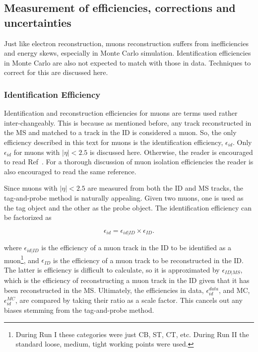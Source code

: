 \subsection{Measurement of efficiencies, corrections and uncertainties}
\par Just like electron reconstruction, muons reconstruction suffers from inefficiencies 
and energy skews, especially in Monte Carlo simulation. Identification efficiencies in Monte Carlo 
are also not expected to match with those in data.  
Techniques to correct for this are discussed here. 

\subsubsection{Identification Efficiency}
\par Identification and reconstruction 
efficiencies for muons are terms used rather inter-changeably. This 
is because as mentioned before, any track reconstructed in the MS and 
matched to a track in the ID is considered a muon. So, the only efficiency described 
in this text for muons is the identification efficiency, $\epsilon_{id}$. 
Only $\epsilon_{id}$ for muons with $|\eta|<2.5$ is discussed here. Otherwise, the reader 
is encouraged to read Ref~\cite{Aad:2014rra}. For a thorough discussion of muon 
isolation efficiencies the reader is also encouraged to read the same reference.  

\par Since muons with $|\eta|<2.5$ are measured from 
both the ID and MS tracks, the tag-and-probe method is naturally appealing. Given two muons, 
one is used as the tag object and the other as the probe object. The identification efficiency 
can be factorized as  

\begin{equation}
\epsilon_{id} = \epsilon_{id|ID}\times\epsilon_{ID}.
\end{equation}

where $\epsilon_{id|ID}$ is the efficiency of a muon track in the ID to be identified as a muon\footnote{During Run I 
these categories were just CB, ST, CT, etc. During Run II the standard loose, medium, tight working points were 
used.}, and $\epsilon_{ID}$ is the efficiency of a muon track to be reconstructed in the ID. The latter is efficiency 
is difficult to calculate, so it is approximated by $\epsilon_{ID|MS}$, which is the efficiency of 
reconstructing a muon track in the ID given that it has been reconstructed in the MS.  
Ultimately, the efficiencies in data, $\epsilon_{id}^{data}$, and MC, $\epsilon_{id}^{MC}$, are compared 
by taking their ratio as a scale factor. This cancels out any biases stemming from the tag-and-probe 
method.  

